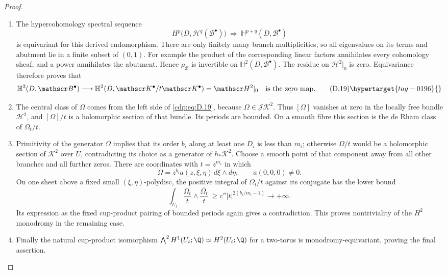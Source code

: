 \begin{proof}
\begin{enumerate}[label={$\langle1\rangle$\arabic*.},leftmargin=*]
\item The hypercohomology spectral sequence
\[
 H^p\bigl(D,\mathcal H^q(\mathscr B^\bullet)\bigr)
 \ \Longrightarrow\ \mathbb H^{p+q}(D,\mathscr B^\bullet)
\]
is equivariant for this derived endomorphism. There are only
finitely many branch multiplicities, so all eigenvalues on its
terms and abutment lie in a finite subset of $(0,1)$. For
example the product of the corresponding linear factors
annihilates every cohomology sheaf, and a power annihilates the
abutment. Hence $\rho_{\mathscr B}$ is invertible on
$\mathbb H^2(D,\mathscr B^\bullet)$. The residue on
$\mathscr H^2|_0$ is zero. Equivariance therefore proves that
\[
 \mathbb H^2(D,\mathscr B^\bullet)\longrightarrow
 \mathbb H^2(D,\mathscr K^\bullet/t\mathscr K^\bullet)
       =\mathscr H^2|_0
 \quad\hbox{is the zero map}.
\tag{D.19}\hypertarget{tag-0196}{}\label{cdp:eq:D.19}
\]

\item The central class of $\Omega$ comes from the left side of
\eqref{cdp:eq:D.19}, because $\Omega\in\mathscr J\mathscr K^2$.
Thus $[\Omega]$ vanishes at zero in the locally free bundle
$\mathscr H^2$, and $[\Omega]/t$ is a holomorphic section of
that bundle. Its periods are bounded. On a smooth fibre this
section is the de Rham class of $\Omega_t/t$.

\item Primitivity of the generator $\Omega$ implies that its order
$b_i$ along at least one $D_i$ is less than $m_i$; otherwise
$\Omega/t$ would be a holomorphic section of $\mathscr K^2$
over $U$, contradicting its choice as a generator of
$h_*\mathscr K^2$. Choose a smooth point of that component
away from all other branches and all further zeros. There
are coordinates with $t=z^{m_i}$ in which
\[
 \Omega=z^{b_i}a(z,\xi,\eta)\,d\xi\wedge d\eta,
 \qquad a(0,0,0)\ne0.
\]
On one sheet above a fixed small $(\xi,\eta)$-polydisc, the
positive integral of $\Omega_t/t$ against its conjugate has
the lower bound
\[
 \int_{U_t}\frac{\Omega_t}{t}\wedge
                    \overline{\frac{\Omega_t}{t}}
 \ \ge c''|t|^{2(b_i/m_i-1)}\longrightarrow+\infty.
\]
Its expression as the fixed cup-product pairing of bounded
periods again gives a contradiction. This proves nontriviality
of the $H^2$ monodromy in the remaining case.

\item Finally the natural
cup-product isomorphism
$\bigwedge^2H^1(U_t;\Q)\simeq H^2(U_t;\Q)$ for a two-torus
is monodromy-equivariant, proving the final assertion.

\end{enumerate}
\end{proof}